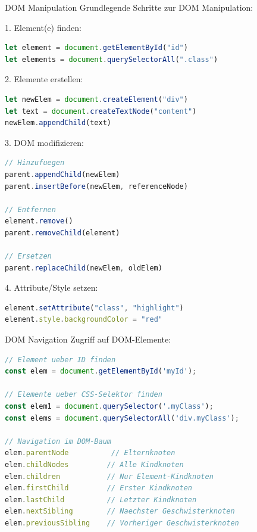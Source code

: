 \begin{KR}{DOM Manipulation}
Grundlegende Schritte zur DOM Manipulation:

1. Element(e) finden:
\begin{lstlisting}[language=JavaScript, style=basesmol]
let element = document.getElementById("id")
let elements = document.querySelectorAll(".class")
\end{lstlisting}

2. Elemente erstellen:
\begin{lstlisting}[language=JavaScript, style=basesmol]
let newElem = document.createElement("div")
let text = document.createTextNode("content")
newElem.appendChild(text)
\end{lstlisting}

3. DOM modifizieren:
\begin{lstlisting}[language=JavaScript, style=basesmol]
// Hinzufuegen
parent.appendChild(newElem)
parent.insertBefore(newElem, referenceNode)

// Entfernen
element.remove()
parent.removeChild(element)

// Ersetzen
parent.replaceChild(newElem, oldElem)
\end{lstlisting}

4. Attribute/Style setzen:
\begin{lstlisting}[language=JavaScript, style=basesmol]
element.setAttribute("class", "highlight")
element.style.backgroundColor = "red"
\end{lstlisting}
\end{KR}

\begin{KR}{DOM Navigation}
Zugriff auf DOM-Elemente:
\begin{lstlisting}[language=JavaScript, style=basesmol]
// Element ueber ID finden
const elem = document.getElementById('myId');

// Elemente ueber CSS-Selektor finden
const elem1 = document.querySelector('.myClass');
const elems = document.querySelectorAll('div.myClass');

// Navigation im DOM-Baum
elem.parentNode          // Elternknoten
elem.childNodes         // Alle Kindknoten
elem.children           // Nur Element-Kindknoten
elem.firstChild         // Erster Kindknoten
elem.lastChild          // Letzter Kindknoten
elem.nextSibling        // Naechster Geschwisterknoten
elem.previousSibling    // Vorheriger Geschwisterknoten
\end{lstlisting}
\end{KR}


